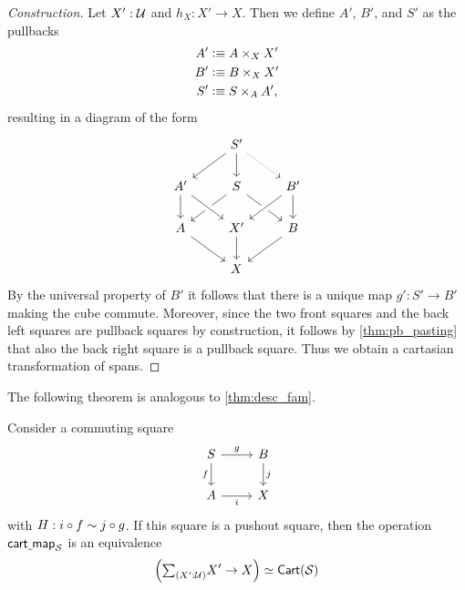 \begin{proof}[Construction]
Let $X':\mathcal{U}$ and $h_X:X'\to X$. Then we define $A'$, $B'$, and $S'$ as the pullbacks
\begin{align*}
A' & \vcentcolon\equiv A\times_X X' \\
B' & \vcentcolon\equiv B\times_X X' \\
S' & \vcentcolon\equiv S\times_A A',
\end{align*}
resulting in a diagram of the form
\begin{equation*}
\begin{tikzcd}
& S' \arrow[dl] \arrow[dr,densely dotted] \arrow[d] \\
A' \arrow[d] & S \arrow[dl] \arrow[dr] & B' \arrow[dl,crossing over] \arrow[d] \\
A \arrow[dr] & X' \arrow[d] \arrow[from=ul,crossing over] & B \arrow[dl] \\
& X
\end{tikzcd}
\end{equation*}
By the universal property of $B'$ it follows that there is a unique map $g':S'\to B'$ making the cube commute. 
Moreover, since the two front squares and the back left squares are pullback squares by construction, it follows by \cref{thm:pb_pasting} that also the back right square is a pullback square. Thus we obtain a cartasian transformation of spans.
\end{proof}

The following theorem is analogous to \cref{thm:desc_fam}.

\begin{thm}\label{thm:descent}
Consider a commuting square
\begin{equation*}
\begin{tikzcd}
S \arrow[r,"g"] \arrow[d,swap,"f"] & B \arrow[d,"j"] \\
A \arrow[r,swap,"i"] & X
\end{tikzcd}
\end{equation*}
with $H:i\circ f\sim j\circ g$. 
If this square is a pushout square, then the operation $\mathsf{cart\underline{\ }{}map}_{\mathcal{S}}$ is an equivalence
\begin{equation*}
\eqv{\Big(\sm{X':\UU}X'\to X\Big)}{\mathsf{Cart}(\mathcal{S})}
\end{equation*}
\end{thm}

